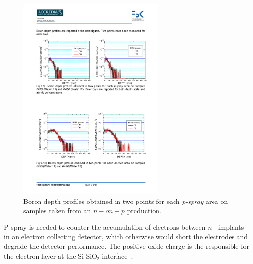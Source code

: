 \begin{figure}[!htbp]
\centering
\includegraphics[width=0.65\textwidth]{sims_pspray.pdf}
\caption{\label{fig:sims_pspray}Boron depth profiles obtained in two points for each {\it p-spray} area 
on samples taken from an $n-on-p$ production.}
\end{figure}

P-spray is needed to counter the accumulation of electrons between $n^+$ implants in an 
electron collecting detector, which otherwise would short the electrodes and degrade the 
detector performance. The positive oxide charge is the responsible for the electron layer 
at the Si-SiO$_2$ interface~\cite{Lutz:411172}. 

